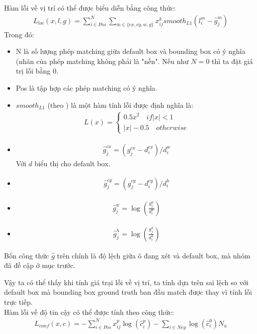 \documentclass[a4paper,12pt]{article}
\begin{document}
	Hàm lỗi về vị trí có thể được biểu diễn bằng công thức:
	\begin{align}
	L_{loc}(x,l,g) = \sum^N_{i \in Pos} \sum_{m \in \{ cx, cy, w, g \}} x^k_{ij} smooth_{L1} (l^m_i - \hat{g}^m_j)
	\end{align}
	Trong đó:
	\begin{itemize}
		\item N là số lượng phép matching giữa default box và bounding box có ý nghĩa (nhãn của phép matching không phải là "nền". Nếu như $N = 0$ thì ta đặt giá trị lỗi bằng 0.
		\item Pos là tập hợp các phép matching có ý nghĩa.
		\item $smooth_{L1}$ (theo \cite{girshick2015fast}) là một hàm tính lỗi được định nghĩa là:
		\begin{align}
		L(x) = \begin{cases} 0.5x^2 \quad if |x| < 1 \\ |x| - 0.5 \quad otherwise \end{cases}
		\end{align}
		\item \begin{align}\hat{g}_j^{cx} = (g_j^{cx} - d_i^{cx}) / d^w_i\end{align}Với $d$ biểu thị cho default box.
		\item \begin{align}\hat{g}_j^{cy} = (g_j^{cy} - d_i^{cy}) / d^h_i\end{align}
		\item \begin{align}\hat{g}^w_j = \log \left( \frac{g_j^w}{d_i^w} \right)\end{align}
		\item \begin{align}\hat{g}^h_j = \log \left( \frac{g_j^h}{d_i^h} \right)\end{align}
	\end{itemize}
	
	Bốn công thức $\hat{g}$ trên chính là độ lệch giữa ô đang xét và default box, mà nhóm đã đề cập ở mục trước.
	
	Vậy ta có thể thấy khi tính giá trại lỗi về vị trí, ta tính dựa trên sai lệch so với default box mà bounding box ground truth ban đầu match được thay vì tính lỗi trực tiếp.\\
	
	Hàm lỗi về độ tin cậy có thể được tính theo công thức:
	\begin{align}
	L_{conf}(x, c) = - \sum^N_{i \in Pos} x^p_{ij} \log (\hat{c}^p_i) - \sum_{i \in Neg} \log (\hat{c}^0_i)
	N_u	\end{align}
	
\end{document}
